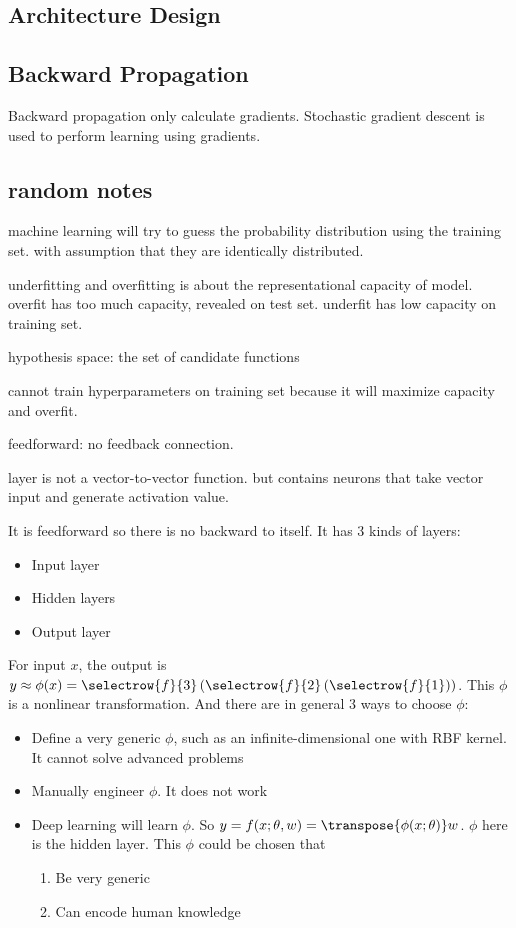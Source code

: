\subsection{Architecture Design}


\subsection{Backward Propagation}

Backward propagation only calculate gradients. Stochastic gradient descent is used to perform learning using gradients.



\subsection{random notes}

machine learning will try to guess the probability distribution using the training set. with assumption that they are identically distributed.

underfitting and overfitting is about the representational capacity of model. overfit has too much capacity, revealed on test set. underfit has low capacity on training set.

hypothesis space: the set of candidate functions


cannot train hyperparameters on training set because it will maximize capacity and overfit.


feedforward: no feedback connection.

layer is not a vector-to-vector function. but contains neurons that take vector input and generate activation value.



It is feedforward so there is no backward to itself. It has 3 kinds of layers:
\begin{itemize}
    \item Input layer
    \item Hidden layers
    \item Output layer
\end{itemize}

For input $x$, the output is $y \approx \phi (x) = \selectrow{f}{3}\left( \selectrow{f}{2} \left(\selectrow{f}{1} \right) \right) $. This $\phi$ is a nonlinear transformation. And there are in general 3 ways to choose $\phi$:
\begin{itemize}
    \item Define a very generic $\phi$, such as an infinite-dimensional one with RBF kernel. It cannot solve advanced problems
    \item Manually engineer $\phi$. It does not work
    \item Deep learning will learn $\phi$. So $y = f(x; \theta, w) = \transpose{\phi(x;\theta)} w$. $\phi$ here is the hidden layer. This $\phi$ could be chosen that
        \begin{enumerate}
            \item Be very generic
            \item Can encode human knowledge
        \end{enumerate}
\end{itemize}


